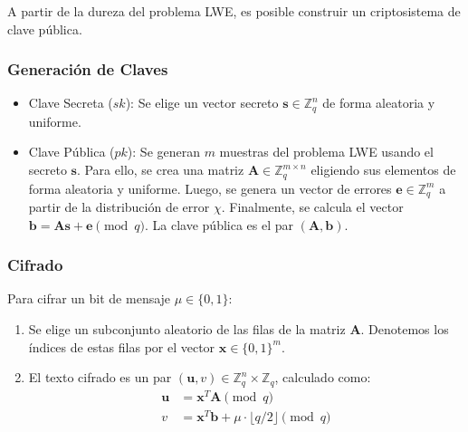 A partir de la dureza del problema LWE, es posible construir un criptosistema de clave pública.

\subsubsection{Generación de Claves}
\begin{itemize}
    \item Clave Secreta ($sk$): Se elige un vector secreto $\mathbf{s} \in \mathbb{Z}_q^n$ de forma aleatoria y uniforme.
    \item Clave Pública ($pk$): Se generan $m$ muestras del problema LWE usando el secreto $\mathbf{s}$. Para ello, se crea una matriz $\mathbf{A} \in \mathbb{Z}_q^{m \times n}$ eligiendo sus elementos de forma aleatoria y uniforme. Luego, se genera un vector de errores $\mathbf{e} \in \mathbb{Z}_q^m$ a partir de la distribución de error $\chi$. Finalmente, se calcula el vector $\mathbf{b} = \mathbf{A}\mathbf{s} + \mathbf{e} \pmod{q}$. La clave pública es el par $(\mathbf{A}, \mathbf{b})$.
\end{itemize}

\subsubsection{Cifrado}
Para cifrar un bit de mensaje $\mu \in \{0, 1\}$:
\begin{enumerate}
    \item Se elige un subconjunto aleatorio de las filas de la matriz $\mathbf{A}$. Denotemos los índices de estas filas por el vector $\mathbf{x} \in \{0, 1\}^m$.
    \item El texto cifrado es un par $(\mathbf{u}, v) \in \mathbb{Z}_q^n \times \mathbb{Z}_q$, calculado como:
    \begin{align}
        \mathbf{u} &= \mathbf{x}^T \mathbf{A} \pmod{q} \\
        v &= \mathbf{x}^T \mathbf{b} + \mu \cdot \lfloor q/2 \rfloor \pmod{q}
    \end{align}
\end{enumerate}

